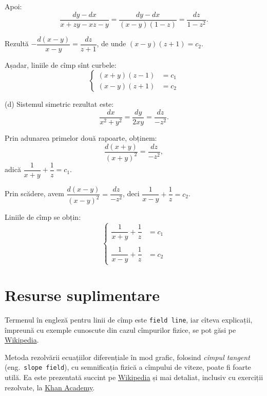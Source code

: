 Apoi:
\[
  \frac{dy - dx}{x + zy - xz - y} = \frac{dy - dx}{(x - y)(1 - z)} = \frac{dz}{1 - z^2}.
\]

Rezultă $-\dfrac{d(x - y)}{x - y} = \dfrac{dz}{z + 1}$, de unde $(x - y)(z + 1) = c_2$.

Așadar, liniile de cîmp sînt curbele:
\[
  \begin{cases}
    (x + y)(z - 1) &= c_1 \\
    (x - y)(z + 1) &= c_2
  \end{cases}
\]

\vspace{1cm}

(d) Sistemul simetric rezultat este:
\[
  \frac{dx}{x^2 + y^2} = \frac{dy}{2xy} = \frac{dz}{-z^2}.
\]

Prin adunarea primelor două rapoarte, obținem:
\[
  \frac{d(x + y)}{(x + y)^2} = \frac{dz}{-z^2},
\]
adică $\dfrac{1}{x + y} + \dfrac{1}{z} = c_1$.

Prin scădere, avem $\dfrac{d(x - y)}{(x - y)^2} = \dfrac{dz}{-z^2}$, deci
$\dfrac{1}{x - y} + \dfrac{1}{z} = c_2$.

Liniile de cîmp se obțin:
\[
  \begin{cases}
    \dfrac{1}{x + y} + \dfrac{1}{z} &= c_1 \\
    & \\
    \dfrac{1}{x - y} + \dfrac{1}{z} &= c_2
  \end{cases}
\]


\section{Resurse suplimentare}

\indent\indent Termenul în engleză pentru linii de cîmp este \texttt{field line}, iar cîteva
explicații, împreună cu exemple cunoscute din cazul cîmpurilor fizice, se pot
găsi pe \href{https://en.wikipedia.org/wiki/Field\_line}{Wikipedia}.

Metoda rezolvării ecuațiilor diferențiale în mod grafic, folosind \emph{cîmpul %
  tangent} (eng.\ \texttt{slope field}), cu semnificația fizică a cîmpului de
viteze, poate fi foarte utilă. Ea este prezentată succint pe
\href{https://en.wikipedia.org/wiki/Slope\_field}{Wikipedia} și mai detaliat,
inclusiv cu exerciții rezolvate, la \href{https://www.khanacademy.org/math/ap-calculus-ab/ab-differential-equations-new/ab-7-3/v/creating-a-slope-field}{Khan Academy}.

